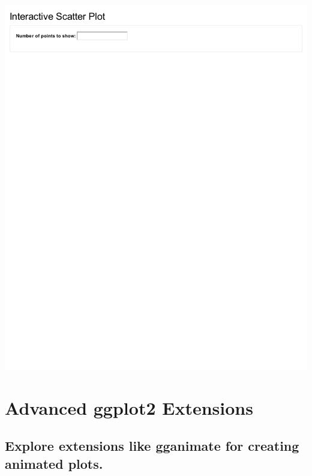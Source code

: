 \documentclass[
]{book}
\begin{document}
\includegraphics{_main_files/figure-latex/unnamed-chunk-92-1.pdf}

\section{Advanced ggplot2 Extensions}\label{advanced-ggplot2-extensions}

\subsection{Explore extensions like gganimate for creating animated plots.}\label{explore-extensions-like-gganimate-for-creating-animated-plots.}
\end{document}
